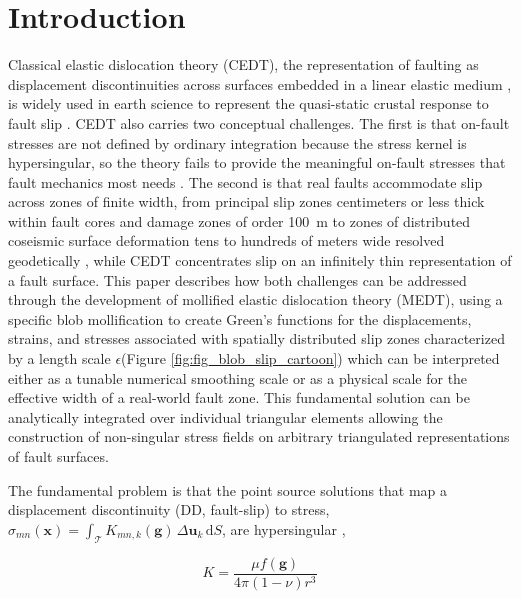 \documentclass[12pt]{article}
\newcommand{\ve}[1]{\mathbf{#1}}
\newcommand{\eps}{\epsilon}
\newcommand{\dd}{\mathrm{d}}
\newcommand{\Tri}{\mathcal{T}}
\newcommand{\obs}{\mathbf{x}}
\newcommand{\Du}{\Delta\mathbf{u}}
\begin{document}
\section{Introduction}
Classical elastic dislocation theory (CEDT), the representation of faulting as displacement discontinuities across surfaces embedded in a linear elastic medium \citep[e.g.,][]{Volterra1907, Steketee1958, ComninouDundurs1975, Okada1985, Okada1992, JeyakumaranRudnickiKeer1992, NikkhooWalter2015}, is widely used in earth science to represent the quasi-static crustal response to fault slip \citep[e.g.,][]{Okada1985, KingSteinLin1994, SimonsFialkoRivera2002, Segall2010}.  CEDT also carries two conceptual challenges.  The first is that on-fault stresses are not defined by ordinary integration because the stress kernel is hypersingular, so the theory fails to provide the meaningful on-fault stresses that fault mechanics most needs \citep{Eringen1977, Eringen1983}.  The second is that real faults accommodate slip across zones of finite width, from principal slip zones centimeters or less thick within fault cores and damage zones of order 100~m \citep[e.g.,][]{ChesterEvansBiegel1993, Sibson2003, FaulknerEtAl2010} to zones of distributed coseismic surface deformation tens to hundreds of meters wide resolved geodetically \citep[e.g.,][]{Milliner2015, Barnhart2020, Li2023}, while CEDT concentrates slip on an infinitely thin representation of a fault surface.  This paper describes how both challenges can be addressed through the development of mollified elastic dislocation theory (MEDT), using a specific blob mollification \citep{Cortez2001} to create Green's functions for the displacements, strains, and stresses associated with spatially distributed slip zones characterized by a length scale $\eps$(Figure \ref{fig:fig_blob_slip_cartoon}) which can be interpreted either as a tunable numerical smoothing scale or as a physical scale for the effective width of a real-world fault zone. This fundamental solution can be analytically integrated over individual triangular elements allowing the construction of non-singular stress fields on arbitrary triangulated representations of fault surfaces.

The fundamental problem is that the point source solutions that map a displacement discontinuity (DD, fault-slip) to stress, $\sigma_{mn}(\obs) = \int_\Tri K_{mn,k}(\ve g)\,\Du_k\,\dd S$, are hypersingular \citep[e.g.,][]{Bonnet1995, sladek1998singular, Aliabadi2002},

\begin{equation}
  K = \frac{\mu f(\mathbf g)}{4\pi(1-\nu)r^{3}}
\end{equation}
\end{document}
